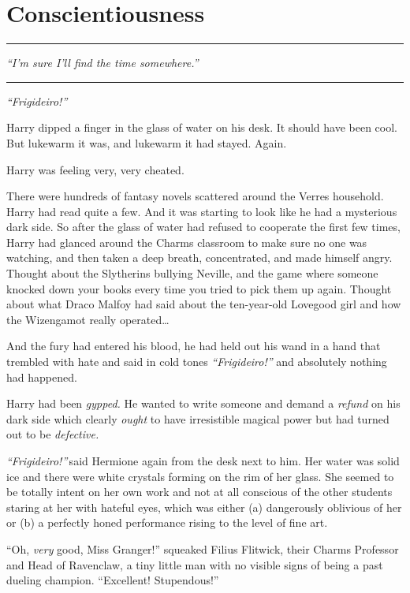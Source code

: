 \chapter{Conscientiousness}

\begin{center}\rule{3in}{0.4pt}\end{center}

\emph{``I'm sure I'll find the time somewhere.''}

\begin{center}\rule{3in}{0.4pt}\end{center}

\emph{``Frigideiro!''}

Harry dipped a finger in the glass of water on his desk. It should have
been cool. But lukewarm it was, and lukewarm it had stayed. Again.

Harry was feeling very, very cheated.

There were hundreds of fantasy novels scattered around the Verres
household. Harry had read quite a few. And it was starting to look like
he had a mysterious dark side. So after the glass of water had refused
to cooperate the first few times, Harry had glanced around the Charms
classroom to make sure no one was watching, and then taken a deep
breath, concentrated, and made himself angry. Thought about the
Slytherins bullying Neville, and the game where someone knocked down
your books every time you tried to pick them up again. Thought about
what Draco Malfoy had said about the ten-year-old Lovegood girl and how
the Wizengamot really operated\ldots{}

And the fury had entered his blood, he had held out his wand in a hand
that trembled with hate and said in cold tones \emph{``Frigideiro!''}
and absolutely nothing had happened.

Harry had been \emph{gypped.} He wanted to write someone and demand a
\emph{refund} on his dark side which clearly \emph{ought} to have
irresistible magical power but had turned out to be \emph{defective.}

\emph{``Frigideiro!''} said Hermione again from the desk next to him.
Her water was solid ice and there were white crystals forming on the rim
of her glass. She seemed to be totally intent on her own work and not at
all conscious of the other students staring at her with hateful eyes,
which was either (a) dangerously oblivious of her or (b) a perfectly
honed performance rising to the level of fine art.

``Oh, \emph{very} good, Miss Granger!'' squeaked Filius Flitwick, their
Charms Professor and Head of Ravenclaw, a tiny little man with no
visible signs of being a past dueling champion. ``Excellent!
Stupendous!''

